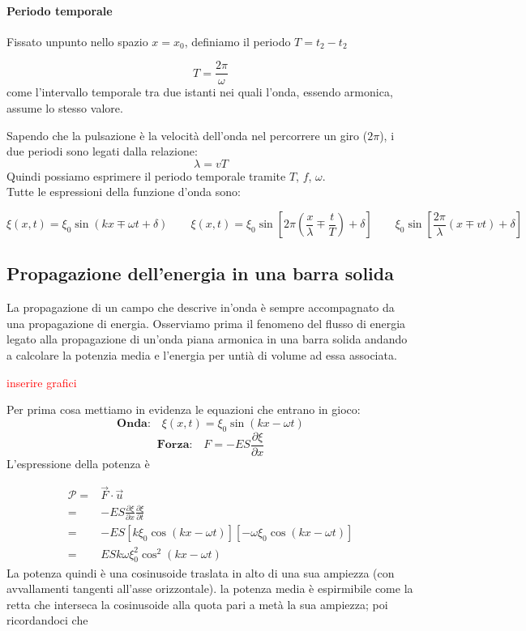 \documentclass[x11names]{report}
\begin{document}
\paragraph{Periodo temporale} Fissato unpunto nello spazio \(x=x_0\), definiamo il periodo \(T = t_2-t_2\)

\[ T = \frac{2\pi}{\omega}\] 
come l'intervallo temporale tra due istanti nei quali l'onda, essendo armonica, assume lo stesso valore.

Sapendo che la pulsazione è la velocità dell'onda nel percorrere un giro (\(2\pi\)), i due periodi sono legati dalla relazione: 
\[ 
\lambda = vT
\]
Quindi possiamo esprimere il periodo temporale tramite \(T\), \(f\), \(\omega\).\\

\noindent
Tutte le espressioni della funzione d'onda sono:

\[ 
\xi(x,t) = \xi_0 \sin\left(kx \mp \omega t + \delta\right) \qquad \xi(x,t) = \xi_0 \sin\left[ 2\pi\left(\frac{x}{\lambda} \mp \frac{t}{T}\right) + \delta\right]  \qquad \xi_0\sin\left[\frac{2\pi}{\lambda}\left(x \mp vt\right) + \delta \right]
\]
	
	
	\newpage
	\subsection{Propagazione dell'energia in una barra solida}
	La propagazione di un campo che descrive in'onda è sempre accompagnato da una propagazione di energia. Osserviamo prima il fenomeno del flusso di energia legato alla propagazione di un'onda piana armonica in una barra solida andando a calcolare la potenzia media e l'energia per untià di volume ad essa associata.\\
	
	\begin{center}
		\textcolor{red}{inserire grafici}
	\end{center}
	
	\noindent
	Per prima cosa mettiamo in evidenza le equazioni che entrano in gioco:
	\[ 
	\textbf{Onda:} \quad \xi(x,t) = \xi_0\sin\left(kx - \omega t\right)
	\]
	\[ 
	\textbf{Forza:} \quad F = -ES\frac{\partial\xi}{\partial x}
	\]
	L'espressione della potenza è 
	
	\begin{align*}
		\mathcal{P} =& \vec{F} \cdot \vec{u} \\
					=& -ES\frac{\partial\xi}{\partial x}\frac{\partial\xi}{\partial t} \\
					=& -ES\left[k\xi_0\cos\left(kx -\omega t\right)\right]\left[-\omega \xi_0\cos\left(kx -\omega t\right)\right] \\
					=& ESk\omega \xi_0^2\cos^2\left(kx-\omega t\right)
	\end{align*}
	La potenza quindi è una cosinusoide traslata in alto di una sua ampiezza (con avvallamenti tangenti all'asse orizzontale). la potenza media è espirmibile come la retta che interseca la cosinusoide alla quota pari a metà la sua ampiezza; poi ricordandoci che
	
\end{document}
